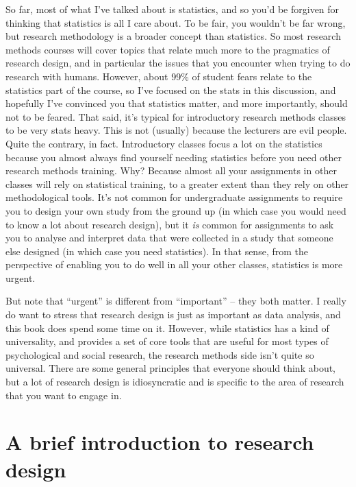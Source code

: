 \documentclass[
  a4paper,
]{book}
\begin{document}
So far, most of what I've talked about is statistics, and so you'd be
forgiven for thinking that statistics is all I care about. To be fair,
you wouldn't be far wrong, but research methodology is a broader concept
than statistics. So most research methods courses will cover topics that
relate much more to the pragmatics of research design, and in particular
the issues that you encounter when trying to do research with humans.
However, about 99\% of student fears relate to the statistics part of
the course, so I've focused on the stats in this discussion, and
hopefully I've convinced you that statistics matter, and more
importantly, should not to be feared. That said, it's typical for
introductory research methods classes to be very stats heavy. This is
not (usually) because the lecturers are evil people. Quite the contrary,
in fact. Introductory classes focus a lot on the statistics because you
almost always find yourself needing statistics before you need other
research methods training. Why? Because almost all your assignments in
other classes will rely on statistical training, to a greater extent
than they rely on other methodological tools. It's not common for
undergraduate assignments to require you to design your own study from
the ground up (in which case you would need to know a lot about research
design), but it \emph{is} common for assignments to ask you to analyse
and interpret data that were collected in a study that someone else
designed (in which case you need statistics). In that sense, from the
perspective of enabling you to do well in all your other classes,
statistics is more urgent.

But note that ``urgent'' is different from ``important'' -- they both
matter. I really do want to stress that research design is just as
important as data analysis, and this book does spend some time on it.
However, while statistics has a kind of universality, and provides a set
of core tools that are useful for most types of psychological and social
research, the research methods side isn't quite so universal. There are
some general principles that everyone should think about, but a lot of
research design is idiosyncratic and is specific to the area of research
that you want to engage in.

\chapter{A brief introduction to research
design}\label{sec-A-brief-introduction-to-research-design}
\end{document}
